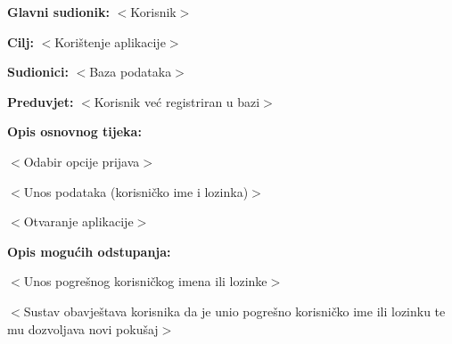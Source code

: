 					
					\noindent {}
					\begin{packed_item}
						
						\item \textbf{Glavni sudionik: }$<$Korisnik$>$
						\item  \textbf{Cilj:} $<$Korištenje aplikacije$>$
						\item  \textbf{Sudionici:} $<$Baza podataka$>$
						\item  \textbf{Preduvjet:} $<$Korisnik već registriran u bazi$>$
						\item  \textbf{Opis osnovnog tijeka:}
						
						\item[] \begin{packed_enum}
							
							\item $<$Odabir opcije prijava$>$
							\item $<$Unos podataka (korisničko ime i lozinka)$>$
							\item $<$Otvaranje aplikacije$>$
					
							
						\end{packed_enum}
						
					\end{packed_item}
					
					\item  \textbf{Opis mogućih odstupanja:}
					
					\item[] \begin{packed_item}
						
						\item[2.a] $<$Unos pogrešnog korisničkog imena ili lozinke$>$
						\item[] \begin{packed_enum}
							
							\item $<$Sustav obavještava korisnika da je unio pogrešno korisničko ime ili lozinku te mu dozvoljava novi pokušaj$>$
							
						\end{packed_enum}
						
					\end{packed_item}
					
